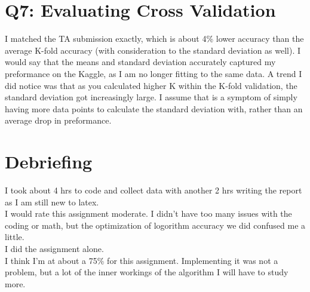 \documentclass{article}
\begin{document}
        
    \section*{Q7: Evaluating Cross Validation}

        I matched the TA submission exactly, which is about 4\% lower accuracy than the average K-fold accuracy (with consideration to the standard deviation as well).
        I would say that the means and standard deviation accurately captured my preformance on the Kaggle, as I am no longer fitting to the same data. 
        A trend I did notice was that as you calculated higher K within the K-fold validation, the standard deviation got increasingly large.
        I assume that is a symptom of simply having more data points to calculate the standard deviation with, rather than an average drop in preformance.

    \section*{Debriefing}
        I took about 4 hrs to code and collect data with another 2 hrs writing the report as I am still new to latex.\\

        I would rate this assignment moderate. I didn't have too many issues with the coding or math, but the optimization
        of logorithm accuracy we did confused me a little.\\

        I did the assignment alone.\\

        I think I'm at about a 75\% for this assignment. Implementing it was not a problem, but a lot of the inner workings of the algorithm I will have to study more.
        \clearpage
\end{document}
